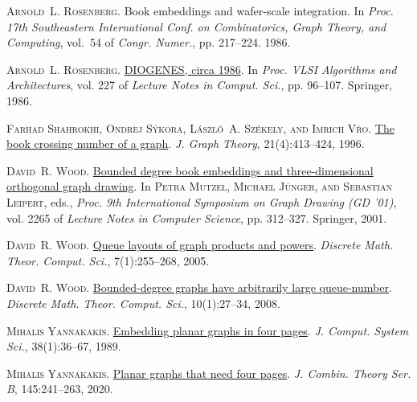 \documentclass[kpfonts]{patmorin}
\providecommand{\DIFaddbegin}{} %
\providecommand{\DIFaddend}{} %
\newcommand{\DIFaddincludegraphics}[2][]{{\color{blue}\fbox{\DIFOincludegraphics[#1]{#2}}}} %
\DeclareRobustCommand{\DIFaddbegin}{\DIFOaddbegin \let\includegraphics\DIFaddincludegraphics} %
\DeclareRobustCommand{\DIFaddend}{\DIFOaddend \let\includegraphics\DIFOincludegraphics} %
\begin{document}
\begin{thebibliography}{44}
	\textsc{Arnold~L. Rosenberg}.
	\newblock Book embeddings and wafer-scale integration.
	\newblock In \emph{Proc. 17th Southeastern International Conf. on
		Combinatorics, Graph Theory, and Computing}, vol.~54 of \emph{Congr. Numer.},
	pp. 217--224. 1986{}.

	\textsc{Arnold~L. Rosenberg}.
	\newblock \href{https://doi.org/10.1007/3-540-16766-8_9}{{DIOGENES}, circa
		1986}.
	\newblock In \emph{Proc. {VLSI} Algorithms and Architectures}, vol. 227 of
	\emph{Lecture Notes in Comput. Sci.}, pp. 96--107. Springer,
	1986{}.

	\textsc{Farhad Shahrokhi, Ondrej S{\'y}kora, L{\'a}szl{\'o}~A. Sz{\'e}kely, and
		Imrich V{\v{r}}{}o}.
	\newblock
	\href{https://doi.org/10.1002/(SICI)1097-0118(199604)21:4<413::AID-JGT7>3.0.CO;2-S}{The
		book crossing number of a graph}.
	\newblock \emph{J. Graph Theory}, 21(4):413--424, 1996.

	\textsc{David~R. Wood}.
	\newblock \href{https://doi.org/10.1007/3-540-45848-4\_25}{Bounded degree book
		embeddings and three-dimensional orthogonal graph drawing}.
	\newblock In \textsc{Petra Mutzel, Michael J{\"{u}}nger, and Sebastian
		Leipert}, eds., \emph{Proc. 9th International Symposium on Graph Drawing (GD
		'01)}, vol. 2265 of \emph{Lecture Notes in Computer Science}, pp. 312--327.
	Springer, 2001.

	\textsc{David~R. Wood}.
	\newblock \href{http://dmtcs.episciences.org/352}{Queue layouts of graph
		products and powers}.
	\newblock \emph{Discrete Math. Theor. Comput. Sci.}, 7(1):255--268, 2005.

	\textsc{David~R. Wood}.
	\newblock \href{http://dmtcs.episciences.org/434}{Bounded-degree graphs have
		arbitrarily large queue-number}.
	\newblock \emph{Discrete Math. Theor. Comput. Sci.}, 10(1):27--34, 2008.

	\textsc{Mihalis Yannakakis}.
	\newblock \href{https://doi.org/10.1016/0022-0000(89)90032-9}{Embedding planar
		graphs in four pages}.
	\newblock \emph{J. Comput. System Sci.}, 38(1):36--67, 1989.

	\textsc{Mihalis Yannakakis}.
	\newblock \href{https://doi.org/10.1016/j.jctb.2020.05.008}{Planar graphs that
		need four pages}.
	\newblock \emph{J. Combin. Theory Ser. B}, 145:241--263, 2020.

\end{thebibliography}
\DIFaddbegin 

\DIFaddend 
\end{document}
